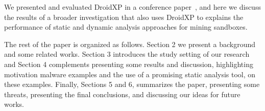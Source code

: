 We presented and evaluated DroidXP in a conference paper~\cite{DBLP:conf/scam/CostaMCMVBC20},
and here we discuss the results of a broader investigation
that also uses DroidXP to explains the performance of static and dynamic analysis
approaches for mining sandboxes.


The rest of the paper is organized as follows. Section 2 we present a background and some related works. Section 3 introduces the study setting of our research and Section 4 complements presenting some results and discussion, highlighting motivation malware examples and the use of a promising static analysis tool, on these examples. Finally, Sections 5 and 6, summarizes the paper, presenting some threats, presenting the final conclusions, and discussing our ideas for future works.



 
 
 
 
